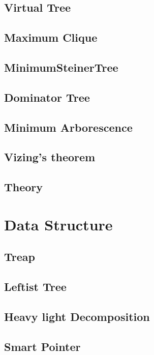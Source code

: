 \subsection{Virtual Tree}

\subsection{Maximum Clique}

\subsection{MinimumSteinerTree}

\subsection{Dominator Tree}

\subsection{Minimum Arborescence}

\subsection{Vizing's theorem}

\subsection{Theory}



\section{Data Structure}
\subsection{Treap}

\subsection{Leftist Tree}

\subsection{Heavy light Decomposition}

\subsection{Smart Pointer}

